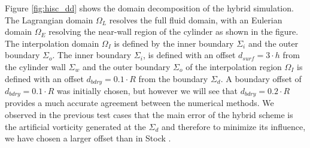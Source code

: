 
Figure \ref{fig:hisc_dd} shows the domain decomposition of the hybrid simulation. The Lagrangian domain $\Omega_L$ resolves the full fluid domain, with an Eulerian domain $\Omega_E$ resolving the near-wall region of the cylinder as shown in the figure. The interpolation domain $\Omega_I$ is defined by the inner boundary $\Sigma_i$ and the outer boundary $\Sigma_o$. The inner boundary $\Sigma_i$, is defined with an offset $d_{surf}=3\cdot{h}$ from the cylinder wall $\Sigma_{w}$ and the  outer boundary $\Sigma_{o}$ of the interpolation region $\Omega_{I}$ is defined with an offset $d_{bdry} = 0.1\cdot{R}$ from the boundary $\Sigma_d$. A boundary offset of $d_{bdry} = 0.1\cdot{R}$ was initially chosen, but however we will see that $d_{bdry} = 0.2\cdot{R}$ provides a much accurate agreement between the numerical methods. We observed in the previous test cases that the main error of the hybrid scheme is the artificial vorticity generated at the $\Sigma_d$ and therefore to minimize its influence, we have chosen a larger offset than in Stock \cite{Stock2010a}.

